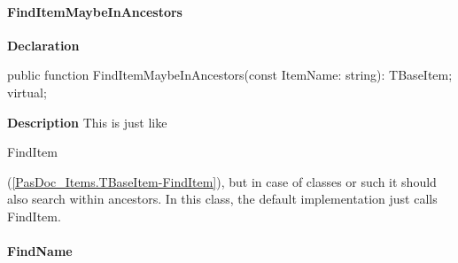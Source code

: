 \documentclass{report}
\newif\ifpdf
\begin{document}
\paragraph*{FindItemMaybeInAncestors}\hspace*{\fill}

\label{PasDoc_Items.TBaseItem-FindItemMaybeInAncestors}
\begin{list}{}{
\setlength{\itemindent}{0cm}
\setlength{\listparindent}{0cm}
\setlength{\leftmargin}{\evensidemargin}
\addtolength{\leftmargin}{\tmplength}
\settowidth{\labelsep}{X}
\addtolength{\leftmargin}{\labelsep}
\setlength{\labelwidth}{\tmplength}
}
\item[\textbf{Declaration}\hfill]
\ifpdf
\begin{flushleft}
\fi
\begin{ttfamily}
public function FindItemMaybeInAncestors(const ItemName: string): TBaseItem; virtual;\end{ttfamily}

\ifpdf
\end{flushleft}
\fi

\par
\item[\textbf{Description}]
This is just like \begin{ttfamily}FindItem\end{ttfamily}(\ref{PasDoc_Items.TBaseItem-FindItem}), but in case of classes or such it should also search within ancestors. In this class, the default implementation just calls FindItem.

\end{list}
\paragraph*{FindName}\hspace*{\fill}
\end{document}
